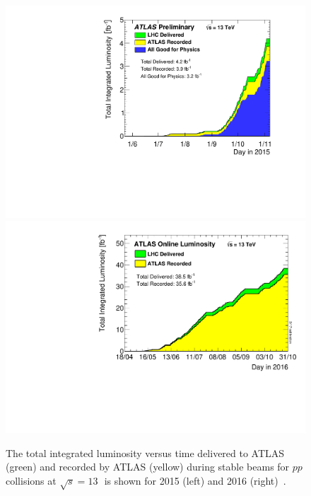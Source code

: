 \begin{figure}[htbp]
\begin{center}
\includegraphics[width=.49\textwidth]{figures/Atlas/Lumi_2015}
\includegraphics[width=.49\textwidth]{figures/Atlas/Lumi_2016}
\end{center}
\caption[Delivered and recorded luminosity in 2015 and 2016]{The total integrated luminosity versus time delivered to ATLAS (green) and recorded by ATLAS (yellow) during stable beams for $pp$ collisions at $\sqrt{s}=13$\,\TeV\, is shown for 2015 (left) and 2016 (right)~\cite{Lumi_Public_Run2}.}
\label{fig:lumi_2015_2016}
\end{figure}

%
